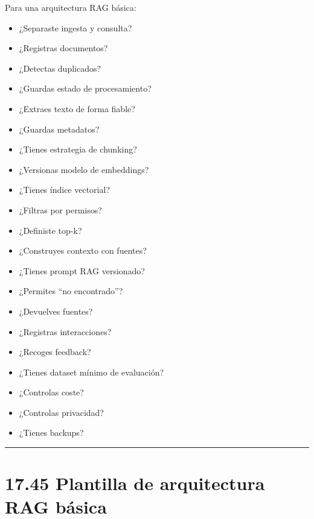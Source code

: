 Para una arquitectura RAG básica:

\begin{itemize}
\tightlist
\item
  ¿Separaste ingesta y consulta?
\item
  ¿Registras documentos?
\item
  ¿Detectas duplicados?
\item
  ¿Guardas estado de procesamiento?
\item
  ¿Extraes texto de forma fiable?
\item
  ¿Guardas metadatos?
\item
  ¿Tienes estrategia de chunking?
\item
  ¿Versionas modelo de embeddings?
\item
  ¿Tienes índice vectorial?
\item
  ¿Filtras por permisos?
\item
  ¿Definiste top-k?
\item
  ¿Construyes contexto con fuentes?
\item
  ¿Tienes prompt RAG versionado?
\item
  ¿Permites ``no encontrado''?
\item
  ¿Devuelves fuentes?
\item
  ¿Registras interacciones?
\item
  ¿Recoges feedback?
\item
  ¿Tienes dataset mínimo de evaluación?
\item
  ¿Controlas coste?
\item
  ¿Controlas privacidad?
\item
  ¿Tienes backups?
\end{itemize}

\begin{center}\rule{0.5\linewidth}{0.5pt}\end{center}

\section{17.45 Plantilla de arquitectura RAG
básica}\label{plantilla-de-arquitectura-rag-buxe1sica}

